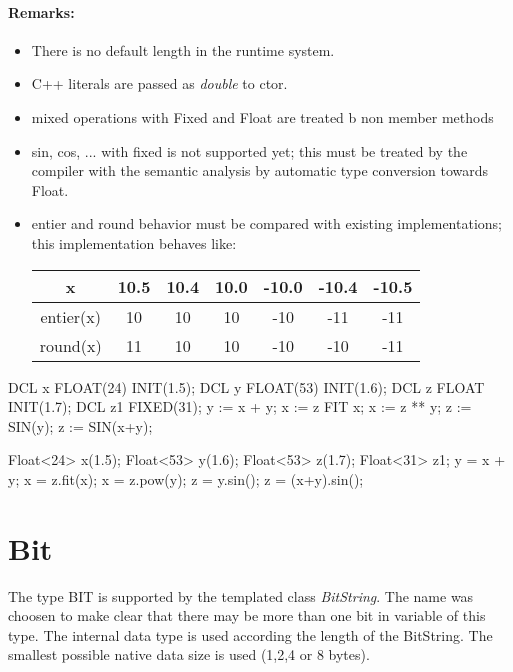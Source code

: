 \paragraph{Remarks:}
\begin{itemize}
\item There is no default length in the runtime system.
\item C++ literals are passed as {\em double} to ctor.
\item mixed operations with Fixed and Float are treated b non member methods
\item sin, cos, ... with fixed is not supported yet; this must be 
   treated by the compiler with the semantic analysis by automatic
   type conversion towards Float.
\item entier and round behavior must be compared with existing implementations; 
    this implementation behaves like:
    
    \begin{tabular}{c||c|c|c|c|c|c}
     x &         10.5 & 10.4 & 10.0 & -10.0 & -10.4 & -10.5 \\
     \hline
     entier(x) & 10 & 10& 10& -10& -11 & -11 \\
     \hline
     round(x) & 11& 10& 10& -10& -10& -11 \\
   \end{tabular} 
\end{itemize}

\begin{PEARLCode}
DCL x FLOAT(24) INIT(1.5); 
DCL y FLOAT(53) INIT(1.6); 
DCL z FLOAT INIT(1.7); 
DCL z1 FIXED(31);
y := x + y;
x := z FIT x;
x := z ** y;
z := SIN(y);
z := SIN(x+y);
\end{PEARLCode}


\begin{CppCode}
Float<24> x(1.5);
Float<53> y(1.6);
Float<53> z(1.7);
Float<31> z1;
y = x + y;
x = z.fit(x);
x = z.pow(y);
z = y.sin();
z = (x+y).sin();
\end{CppCode}


\section{Bit}
The type BIT is supported by the templated class {\em BitString}.
The name was choosen to make clear that there may be  more than one bit
in variable of this type.
The internal data type is used according the length of the BitString. 
The smallest possible native data size is used (1,2,4 or 8 bytes).

